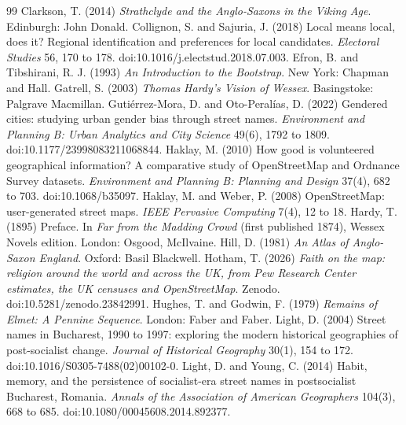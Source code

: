 \documentclass[11pt,a4paper]{article}
\begin{document}
\begin{thebibliography}{99}
 Clarkson, T. (2014) \textit{Strathclyde and the Anglo-Saxons in the Viking Age}. Edinburgh: John Donald.
 Collignon, S. and Sajuria, J. (2018) Local means local, does it? Regional identification and preferences for local candidates. \textit{Electoral Studies} 56, 170 to 178. doi:10.1016/j.electstud.2018.07.003.
 Efron, B. and Tibshirani, R. J. (1993) \textit{An Introduction to the Bootstrap}. New York: Chapman and Hall.
 Gatrell, S. (2003) \textit{Thomas Hardy's Vision of Wessex}. Basingstoke: Palgrave Macmillan.
 Gutiérrez-Mora, D. and Oto-Peralías, D. (2022) Gendered cities: studying urban gender bias through street names. \textit{Environment and Planning B: Urban Analytics and City Science} 49(6), 1792 to 1809. doi:10.1177/23998083211068844.
 Haklay, M. (2010) How good is volunteered geographical information? A comparative study of OpenStreetMap and Ordnance Survey datasets. \textit{Environment and Planning B: Planning and Design} 37(4), 682 to 703. doi:10.1068/b35097.
 Haklay, M. and Weber, P. (2008) OpenStreetMap: user-generated street maps. \textit{IEEE Pervasive Computing} 7(4), 12 to 18.
 Hardy, T. (1895) Preface. In \textit{Far from the Madding Crowd} (first published 1874), Wessex Novels edition. London: Osgood, McIlvaine.
 Hill, D. (1981) \textit{An Atlas of Anglo-Saxon England}. Oxford: Basil Blackwell.
 Hotham, T. (2026) \textit{Faith on the map: religion around the world and across the UK, from Pew Research Center estimates, the UK censuses and OpenStreetMap}. Zenodo. doi:10.5281/zenodo.23842991.
 Hughes, T. and Godwin, F. (1979) \textit{Remains of Elmet: A Pennine Sequence}. London: Faber and Faber.
 Light, D. (2004) Street names in Bucharest, 1990 to 1997: exploring the modern historical geographies of post-socialist change. \textit{Journal of Historical Geography} 30(1), 154 to 172. doi:10.1016/S0305-7488(02)00102-0.
 Light, D. and Young, C. (2014) Habit, memory, and the persistence of socialist-era street names in postsocialist Bucharest, Romania. \textit{Annals of the Association of American Geographers} 104(3), 668 to 685. doi:10.1080/00045608.2014.892377.

\end{thebibliography}
\end{document}
